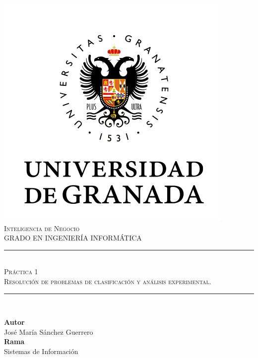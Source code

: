 \documentclass[11pt,a4paper]{article}
\newcommand{\asignatura}{Inteligencia de Negocio}
\newcommand{\autor}{José María Sánchez Guerrero}
\newcommand{\titulo}{Práctica 1}
\newcommand{\subtitulo}{Resolución de problemas de clasificación y análisis experimental.}
\begin{document}

\begin{titlepage}

\begin{minipage}{\textwidth}

\centering

\includegraphics[scale=0.5]{img/ugr.png}\\

\textsc{\Large \asignatura{}\\[0.2cm]}
\textsc{GRADO EN INGENIERÍA INFORMÁTICA}\\[1cm]

\noindent\rule[-1ex]{\textwidth}{1pt}\\[1.5ex]
\textsc{{\Huge \titulo\\[0.5ex]}}
\textsc{{\Large \subtitulo\\}}
\noindent\rule[-1ex]{\textwidth}{2pt}\\[3.5ex]

\end{minipage}

\vspace{0.5cm}

\begin{minipage}{\textwidth}

\centering

\textbf{Autor}\\ {\autor{}}\\[2.5ex]
\textbf{Rama}\\ {Sistemas de Información}\\[2.5ex]
\vspace{0.3cm}


\end{minipage}
\end{titlepage}
\end{document}
